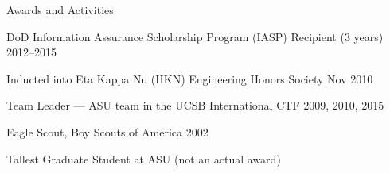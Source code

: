 \documentclass{resume} %
\begin{document}
\begin{rSection}{Awards and Activities}

	\begin{rBulletList}

	\item DoD Information Assurance Scholarship Program (IASP) Recipient (3 years) \hfill 2012--2015

	\item Inducted into Eta Kappa Nu (HKN) Engineering Honors Society \hfill Nov 2010

	\item Team Leader --- ASU team in the UCSB International CTF \hfill 2009, 2010, 2015

	\item Eagle Scout, Boy Scouts of America \hfill 2002

	\item Tallest Graduate Student at ASU \hfill (not an actual award)

	\end{rBulletList}

\end{rSection}





\end{document}
